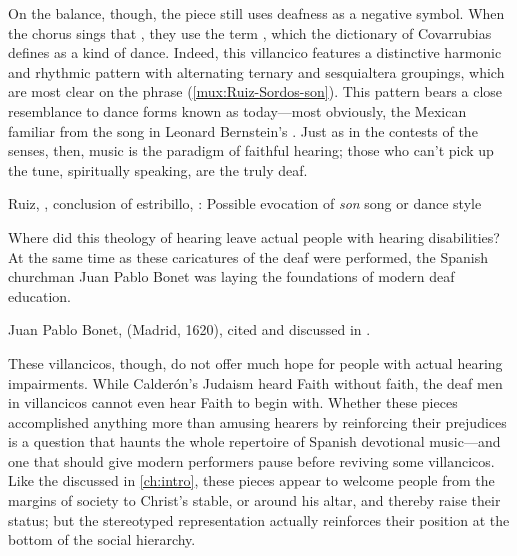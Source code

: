 On the balance, though, the piece still uses deafness as a negative symbol.
When the chorus sings that , they use the term , which the dictionary of
Covarrubias defines as a kind of dance.
Indeed, this villancico features a distinctive harmonic and rhythmic pattern
with alternating ternary and sesquialtera groupings, which are most clear on the
phrase 
(\cref{mux:Ruiz-Sordos-son}).
This pattern bears a close resemblance to dance forms known as 
today---most obviously, the Mexican  familiar from the song
 in Leonard Bernstein's .%
    \Autocites
    []{Grove}
    {Wells:WestSideStory}
Just as in the contests of the senses, then, music is the paradigm of faithful
hearing; those who can't pick up the tune, spiritually speaking, are the truly
deaf.

{Ruiz, , conclusion of estribillo,
: Possible evocation of \emph{son} song or dance style}

Where did this theology of hearing leave actual people with hearing
disabilities? 
At the same time as these caricatures of the deaf were performed, the Spanish
churchman Juan Pablo Bonet was laying the foundations of modern deaf education.%
\begin{Footnote}
    Juan Pablo Bonet,  (Madrid, 1620), cited and discussed in
    \autocite{Plann:DeafEducationSpain}.  
\end{Footnote}
These villancicos, though, do not offer much hope for people with actual
hearing impairments.
While Calderón's Judaism heard Faith without faith, the deaf men in villancicos
cannot even hear Faith to begin with.
Whether these pieces accomplished anything more than amusing hearers by
reinforcing their prejudices is a question that haunts the whole repertoire of
Spanish devotional music---and one that should give modern performers pause
before reviving some villancicos.%
    \Autocite[7]{Cashner:WLSCM32}
Like the  discussed in \cref{ch:intro}, these pieces
appear to welcome people from the margins of society to Christ's stable, or
around his altar, and thereby raise their status; but the stereotyped
representation actually reinforces their position at the bottom of the social
hierarchy.

